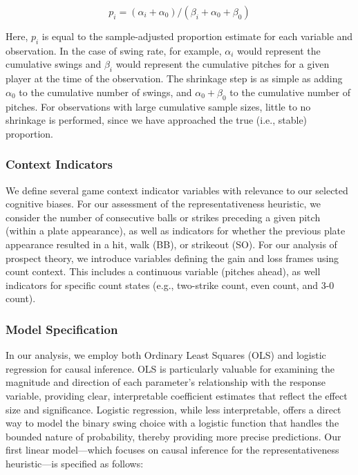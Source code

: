 \documentclass[12pt]{article}
\numberwithin{equation}{section}
\begin{document}
\begin{equation}
p_i = (\alpha_i + \alpha_0)/(\beta_i+ \alpha_0 + \beta_0)
\end{equation}

\vspace{5mm} %

Here, $p_i$ is equal to the sample-adjusted proportion estimate for each variable and observation. In the case of swing rate, for example, $\alpha_i$ would represent the cumulative swings and $\beta_i$ would represent the cumulative pitches for a given player at the time of the observation. The shrinkage step is as simple as adding $\alpha_0$  to the cumulative number of swings, and $\alpha_0 + \beta_0$ to the cumulative number of pitches. For observations with large cumulative sample sizes, little to no shrinkage is performed, since we have approached the true (i.e., stable) proportion.

\subsubsection{Context Indicators}

We define several game context indicator variables with relevance to our selected cognitive biases. For our assessment of the representativeness heuristic, we consider the number of consecutive balls or strikes preceding a given pitch (within a plate appearance), as well as indicators for whether the previous plate appearance resulted in a hit, walk (BB), or strikeout (SO). For our analysis of prospect theory, we introduce variables defining the gain and loss frames using count context. This includes a continuous variable (pitches ahead), as well indicators for specific count states (e.g., two-strike count, even count, and 3-0 count).

\subsubsection{Model Specification}

In our analysis, we employ both Ordinary Least Squares (OLS) and logistic regression for causal inference. OLS is particularly valuable for examining the magnitude and direction of each parameter’s relationship with the response variable, providing clear, interpretable coefficient estimates that reflect the effect size and significance. Logistic regression, while less interpretable, offers a direct way to model the binary swing choice with a logistic function that handles the bounded nature of probability, thereby providing more precise predictions. Our first linear model---which focuses on causal inference for the representativeness heuristic---is specified as follows:
\end{document}
